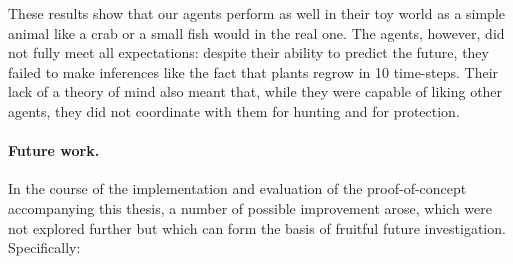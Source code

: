 These results show that our agents perform as well in their toy world as a simple animal like a crab or a small fish would in the real one. The agents, however, did not fully meet all expectations: despite their ability to predict the future, they failed to make inferences like the fact that plants regrow in 10 time-steps. Their lack of a theory of mind also meant that, while they were capable of liking other agents, they did not coordinate with them for hunting and for protection.

\paragraph{Future work.} In the course of the implementation and evaluation of the proof-of-concept accompanying this thesis, a number of possible improvement arose, which were not explored further but which can form the basis of fruitful future investigation. Specifically:

